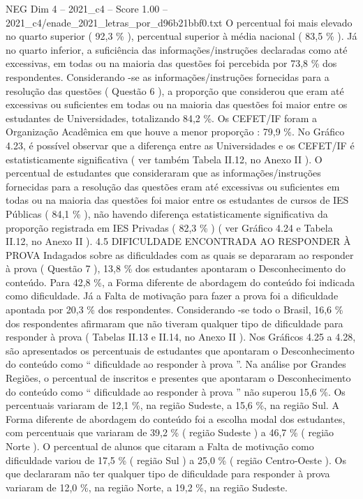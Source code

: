 \begin{textsample}{NEG Dim 4 – 2021\_c4 – Score 1.00 – 2021\_c4/enade\_2021\_letras\_por\_d96b21bbf0.txt}
O percentual foi mais elevado no quarto superior ( 92,3 \% ), percentual superior à média nacional ( 83,5 \% ).
Já no quarto inferior, a suficiência das informações/instruções declaradas como até excessivas, em todas ou na maioria das questões foi percebida por 73,8 \% dos respondentes.
Considerando -se as informações/instruções fornecidas para a resolução das questões ( Questão 6 ), a proporção que considerou que eram até excessivas ou suficientes em todas ou na maioria das questões foi maior entre os estudantes de Universidades, totalizando 84,2 \%.
Os CEFET/IF foram a Organização Acadêmica em que houve a menor proporção : 79,9 \%.
No Gráfico 4.23, é possível observar que a diferença entre as Universidades e os CEFET/IF é estatisticamente significativa ( ver também Tabela II.12, no Anexo II ).
O percentual de estudantes que consideraram que as informações/instruções fornecidas para a resolução das questões eram até excessivas ou suficientes em todas ou na maioria das questões foi maior entre os estudantes de cursos de IES Públicas ( 84,1 \% ), não havendo diferença estatisticamente significativa da proporção registrada em IES Privadas ( 82,3 \% ) ( ver Gráfico 4.24 e Tabela II.12, no Anexo II ). 4.5 DIFICULDADE ENCONTRADA AO RESPONDER À PROVA Indagados sobre as dificuldades com as quais se depararam ao responder à prova ( Questão 7 ), 13,8 \% dos estudantes apontaram o Desconhecimento do conteúdo.
Para 42,8 \%, a Forma diferente de abordagem do conteúdo foi indicada como dificuldade.
Já a Falta de motivação para fazer a prova foi a dificuldade apontada por 20,3 \% dos respondentes.
Considerando -se todo o Brasil, 16,6 \% dos respondentes afirmaram que não tiveram qualquer tipo de dificuldade para responder à prova ( Tabelas II.13 e II.14, no Anexo II ).
Nos Gráficos 4.25 a 4.28, são apresentados os percentuais de estudantes que apontaram o Desconhecimento do conteúdo como “ dificuldade ao responder à prova ”.
Na análise por Grandes Regiões, o percentual de inscritos e presentes que apontaram o Desconhecimento do conteúdo como “ dificuldade ao responder à prova ” não superou 15,6 \%.
Os percentuais variaram de 12,1 \%, na região Sudeste, a 15,6 \%, na região Sul.
A Forma diferente de abordagem do conteúdo foi a escolha modal dos estudantes, com percentuais que variaram de 39,2 \% ( região Sudeste ) a 46,7 \% ( região Norte ).
O percentual de alunos que citaram a Falta de motivação como dificuldade variou de 17,5 \% ( região Sul ) a 25,0 \% ( região Centro-Oeste ).
Os que declararam não ter qualquer tipo de dificuldade para responder à prova variaram de 12,0 \%, na região Norte, a 19,2 \%, na região Sudeste.

\end{textsample}

